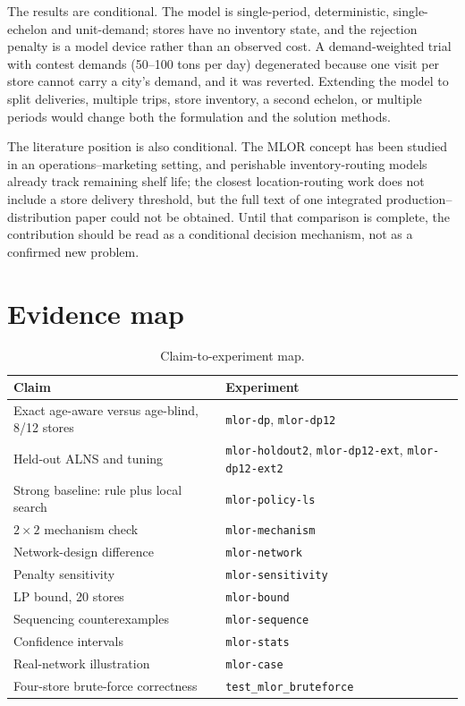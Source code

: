 \documentclass[preprint,12pt]{elsarticle}
\begin{document}
The results are conditional. The model is single-period, deterministic, single-echelon and unit-demand; stores have no inventory state, and the rejection penalty is a model device rather than an observed cost. A demand-weighted trial with contest demands (50--100 tons per day) degenerated because one visit per store cannot carry a city's demand, and it was reverted. Extending the model to split deliveries, multiple trips, store inventory, a second echelon, or multiple periods would change both the formulation and the solution methods.

The literature position is also conditional. The MLOR concept has been studied in an operations--marketing setting, and perishable inventory-routing models already track remaining shelf life; the closest location-routing work does not include a store delivery threshold, but the full text of one integrated production--distribution paper could not be obtained. Until that comparison is complete, the contribution should be read as a conditional decision mechanism, not as a confirmed new problem.

\appendix
\section{Evidence map}

\begin{table}[t]
\centering
\caption{Claim-to-experiment map.}
\label{tab:evidence}
\small
\begin{tabular}{p{4.6cm}p{7.0cm}}
\toprule
Claim & Experiment \\
\midrule
Exact age-aware versus age-blind, 8/12 stores & \texttt{mlor-dp}, \texttt{mlor-dp12} \\
Held-out ALNS and tuning & \texttt{mlor-holdout2}, \texttt{mlor-dp12-ext}, \texttt{mlor-dp12-ext2} \\
Strong baseline: rule plus local search & \texttt{mlor-policy-ls} \\
$2\times2$ mechanism check & \texttt{mlor-mechanism} \\
Network-design difference & \texttt{mlor-network} \\
Penalty sensitivity & \texttt{mlor-sensitivity} \\
LP bound, 20 stores & \texttt{mlor-bound} \\
Sequencing counterexamples & \texttt{mlor-sequence} \\
Confidence intervals & \texttt{mlor-stats} \\
Real-network illustration & \texttt{mlor-case} \\
Four-store brute-force correctness & \texttt{test\_mlor\_bruteforce} \\
\bottomrule
\end{tabular}
\end{table}
\end{document}
